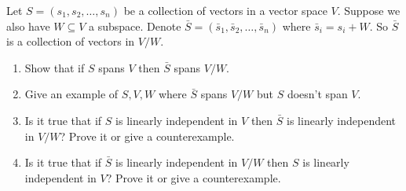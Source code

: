 \documentclass{amsart}
\begin{document}
	Let $S = (s_1, s_2, \ldots, s_n)$ be a collection of vectors in a vector space $V$.
	Suppose we also have $W \subseteq V$ a subspace.
	Denote $\bar S = (\bar s_1, \bar s_2, \ldots, \bar s_n)$ where $\bar s_i = s_i + W$.
	So $\bar S$ is a collection of vectors in $V/W$.
	\begin{enumerate}
		\item Show that if $S$ spans $V$ then $\bar S$ spans $V/W$.
		\item Give an example of $S, V, W$ where $\bar S$ spans $V/W$ but $S$ doesn't span $V$.
		\item Is it true that if $S$ is linearly independent in $V$ then $\bar S$ is linearly independent in $V/W$?
		Prove it or give a counterexample.
		\item Is it true that if $\bar S$ is linearly independent in $V/W$ then $S$ is linearly independent in $V$?
		Prove it or give a counterexample.
	\end{enumerate}
\end{document}
